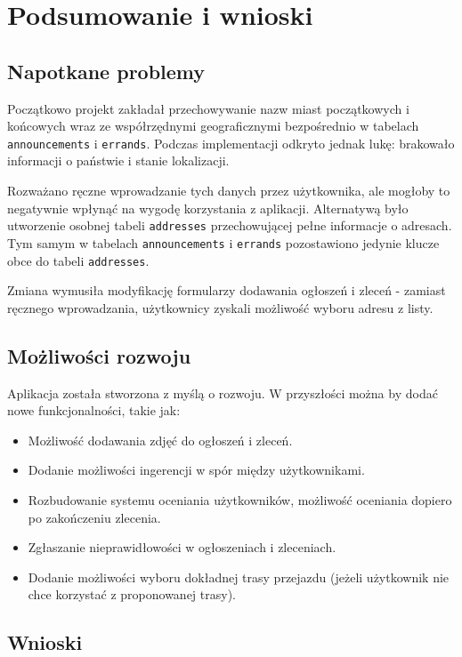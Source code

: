\chapter{Podsumowanie i wnioski}

\section{Napotkane problemy}

Początkowo projekt zakładał przechowywanie nazw miast początkowych i końcowych wraz ze współrzędnymi geograficznymi bezpośrednio w tabelach \texttt{announcements} i \texttt{errands}. Podczas implementacji odkryto jednak lukę: brakowało informacji o państwie i stanie lokalizacji.

Rozważano ręczne wprowadzanie tych danych przez użytkownika, ale mogłoby to negatywnie wpłynąć na wygodę korzystania z aplikacji. Alternatywą było utworzenie osobnej tabeli \texttt{addresses} przechowującej pełne informacje o adresach. Tym samym w tabelach \texttt{announcements} i \texttt{errands} pozostawiono jedynie klucze obce do tabeli \texttt{addresses}.

Zmiana wymusiła modyfikację formularzy dodawania ogłoszeń i zleceń - zamiast ręcznego wprowadzania, użytkownicy zyskali możliwość wyboru adresu z listy.

\section{Możliwości rozwoju}

Aplikacja została stworzona z myślą o rozwoju. W przyszłości można by dodać nowe funkcjonalności, takie jak:
\begin{itemize}
    \item Możliwość dodawania zdjęć do ogłoszeń i zleceń.
    \item Dodanie możliwości ingerencji w spór między użytkownikami.
    \item Rozbudowanie systemu oceniania użytkowników, możliwość oceniania dopiero po zakończeniu zlecenia.
    \item Zgłaszanie nieprawidłowości w ogłoszeniach i zleceniach.
    \item Dodanie możliwości wyboru dokładnej trasy przejazdu (jeżeli użytkownik nie chce korzystać z proponowanej trasy).
\end{itemize}

\section{Wnioski}


